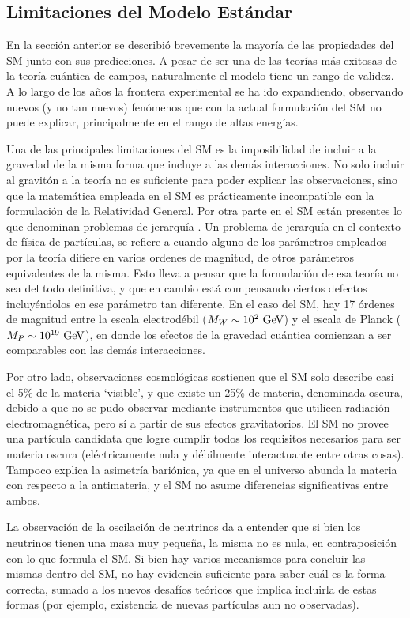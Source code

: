 \subsection{Limitaciones del Modelo Estándar}

En la sección anterior se describió brevemente la mayoría de las propiedades del SM junto con sus predicciones. A pesar de ser una de las teorías más exitosas de la teoría cuántica de campos, naturalmente el modelo tiene un rango de validez. A lo largo de los años la frontera experimental se ha ido expandiendo, observando nuevos (y no tan nuevos) fenómenos que con la actual formulación del SM no puede explicar, principalmente en el rango de altas energías.

Una de las principales limitaciones del SM es la imposibilidad de incluir a la gravedad de la misma forma que incluye a las demás interacciones. No solo incluir al gravitón a la teoría no es suficiente para poder explicar las observaciones, sino que la matemática empleada en el SM es prácticamente incompatible con la formulación de la Relatividad General. Por otra parte en el SM están presentes lo que denominan problemas de jerarquía \cite{hierarchy}. Un problema de jerarquía en el contexto de física de partículas, se refiere a cuando alguno de los parámetros empleados por la teoría difiere en varios ordenes de magnitud, de otros parámetros equivalentes de la misma. Esto lleva a pensar que la formulación de esa teoría no sea del todo definitiva, y que en cambio está compensando ciertos defectos incluyéndolos en ese parámetro tan diferente. En el caso del SM, hay 17 órdenes de magnitud entre la escala electrodébil ($M_W\sim 10^{2}\ \text{GeV}$) y el escala de Planck ($M_P\sim 10^{19}\ \gev$), en donde los efectos de la gravedad cuántica comienzan a ser comparables con las demás interacciones.

Por otro lado, observaciones cosmológicas sostienen que el SM solo describe casi el 5\% de la materia `visible', y que existe un 25\% de materia, denominada oscura, debido a que no se pudo observar mediante instrumentos que utilicen radiación electromagnética, pero sí a partir de sus efectos gravitatorios. El SM no provee una partícula candidata que logre cumplir todos los requisitos necesarios para ser materia oscura (eléctricamente nula y débilmente interactuante entre otras cosas). Tampoco explica la asimetría bariónica, ya que en el universo abunda la materia con respecto a la antimateria, y el SM no asume diferencias significativas entre ambos.

La observación de la oscilación de neutrinos da a entender que si bien los neutrinos tienen una masa muy pequeña, la misma no es nula, en contraposición con lo que formula el SM. Si bien hay varios mecanismos para concluir las mismas dentro del SM, no hay evidencia suficiente para saber cuál es la forma correcta, sumado a los nuevos desafíos teóricos que implica incluirla de estas formas (por ejemplo, existencia de nuevas partículas aun no observadas).


